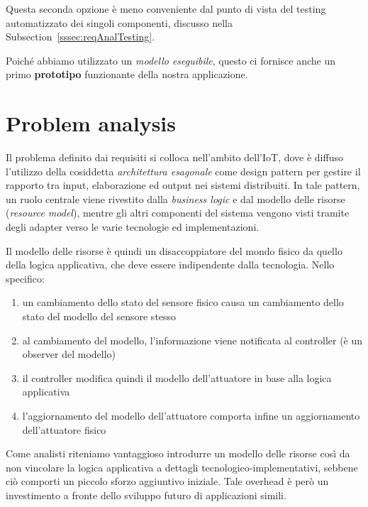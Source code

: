 \documentclass{../llncs}
\newcommand{\labelsec}[1]{\label{sec:#1}}
\newcommand{\xsss}[1]{\subsectionname~\ref{sssec:#1}}
\newcommand{\subsectionname}{Subsection}
\begin{document}
Questa seconda opzione è meno conveniente dal punto di vista del testing automatizzato dei singoli componenti, discusso nella \xsss{reqAnalTesting}.\\

\vspace{8px}

Poiché abbiamo utilizzato un \emph{modello eseguibile}, questo ci fornisce anche un primo \textbf{prototipo} funzionante della nostra applicazione.

\section{Problem analysis}
\labelsec{ProblemAnalysis}
Il problema definito dai requisiti si colloca nell'ambito dell'IoT, dove è diffuso l'utilizzo della cosiddetta \emph{architettura esagonale} come design pattern per gestire il rapporto tra input, elaborazione ed output nei sistemi distribuiti. In tale pattern, un ruolo centrale viene rivestito dalla \emph{business logic} e dal modello delle risorse (\emph{resource model}), mentre gli altri componenti del sistema vengono visti tramite degli adapter verso le varie tecnologie ed implementazioni.

Il modello delle risorse è quindi un disaccoppiatore del mondo fisico da quello della logica applicativa, che deve essere indipendente dalla tecnologia. Nello specifico:
\begin{enumerate}
\item un cambiamento dello stato del sensore fisico causa un cambiamento dello stato del modello del sensore stesso
\item al cambiamento del modello, l'informazione viene notificata al controller (è un observer del modello)
\item il controller modifica quindi il modello dell'attuatore in base alla logica applicativa
\item l'aggiornamento del modello dell'attuatore comporta infine un aggiornamento dell'attuatore fisico
\end{enumerate}

Come analisti riteniamo vantaggioso introdurre un modello delle risorse così da non vincolare la logica applicativa a dettagli tecnologico-implementativi, sebbene ciò comporti un piccolo sforzo aggiuntivo iniziale. Tale overhead è però un investimento a fronte dello sviluppo futuro di applicazioni simili.%
\end{document}
